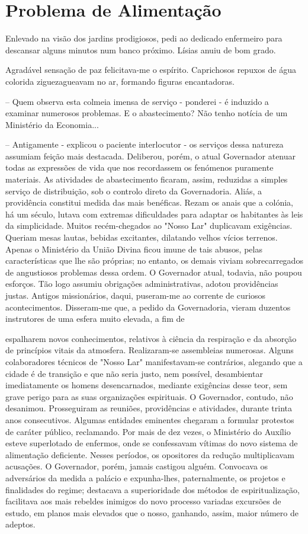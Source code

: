 \documentclass[portuguese,12pt,a4paper]{scrbook}
\begin{document}
	
	\chapter{Problema de Alimentação}
	
	Enlevado na visão dos jardins prodigiosos, pedi ao dedicado enfermeiro para descansar alguns minutos num banco próximo. Lísias anuiu de bom grado.
	
	Agradável sensação de paz felicitava-me o espírito. Caprichosos repuxos de água colorida ziguezagueavam no ar, formando figuras encantadoras.
	
	– Quem observa esta colmeia imensa de serviço - ponderei - é induzido a examinar numerosos problemas. E o abastecimento? Não tenho notícia de um Ministério da Economia...
	
	– Antigamente - explicou o paciente interlocutor - os serviços dessa natureza assumiam feição mais destacada. Deliberou, porém, o atual Governador atenuar todas as expressões de vida que nos recordassem os fenómenos puramente materiais. As atividades de abastecimento ficaram, assim, reduzidas a simples serviço de distribuição, sob o controlo direto da Governadoria. Aliás, a providência constitui medida das mais benéficas. Rezam os anais que a colónia, há um século, lutava com extremas dificuldades para adaptar os habitantes às leis da simplicidade. Muitos recém-chegados ao "Nosso Lar" duplicavam exigências. Queriam mesas lautas, bebidas excitantes, dilatando velhos vícios terrenos. Apenas o Ministério da União Divina ficou imune de tais abusos, pelas características que lhe são próprias; no entanto, os demais viviam sobrecarregados de angustiosos problemas dessa ordem. O Governador atual, todavia, não poupou esforços. Tão logo assumiu obrigações administrativas, adotou providências justas. Antigos missionários, daqui, puseram-me ao corrente de curiosos acontecimentos. Disseram-me que, a pedido da Governadoria, vieram duzentos instrutores de uma esfera muito elevada, a fim de
	
	
	espalharem novos conhecimentos, relativos à ciência da respiração e da absorção de princípios vitais da atmosfera. Realizaram-se assembleias numerosas. Alguns colaboradores técnicos de "Nosso Lar" manifestavam-se contrários, alegando que a cidade é de transição e que não seria justo, nem possível, desambientar imediatamente os homens desencarnados, mediante exigências desse teor, sem grave perigo para as suas organizações espirituais. O Governador, contudo, não desanimou. Prosseguiram as reuniões, providências e atividades, durante trinta anos consecutivos. Algumas entidades eminentes chegaram a formular protestos de caráter público, reclamando. Por mais de dez vezes, o Ministério do Auxílio esteve superlotado de enfermos, onde se confessavam vítimas do novo sistema de alimentação deficiente. Nesses períodos, os opositores da redução multiplicavam acusações. O Governador, porém, jamais castigou alguém. Convocava os adversários da medida a palácio e expunha-lhes, paternalmente, os projetos e finalidades do regime; destacava a superioridade dos métodos de espiritualização, facilitava aos mais rebeldes inimigos do novo processo variadas excursões de estudo, em planos mais elevados que o nosso, ganhando, assim, maior número de adeptos.
	
\end{document}
